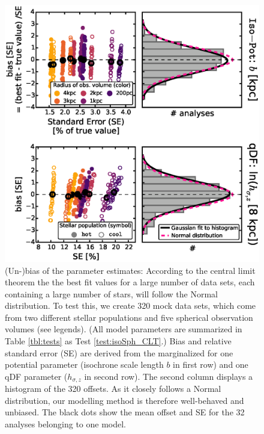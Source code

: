 \begin{figure}[!htbp]
\centering
\includegraphics[width=\columnwidth]{figs/isoSph_CLT_2.eps}
\caption{(Un-)bias of the parameter estimates: According to the central limit theorem the the best fit values for a large number of data sets, each containing a large number of stars, will follow the Normal distribution. To test this, we create 320 mock data sets, which come from two different stellar populations and five spherical observation volumes (see legends). (All model parameters are summarized in Table \ref{tbl:tests} as Test \ref{test:isoSph_CLT}.) Bias and relative standard error (SE) are derived from the marginalized \pdf{} for one potential parameter (isochrone scale length $b$ in first row) and one qDF parameter ($h_{\sigma,z}$ in second row). The second column displays a histogram of the 320 offsets. As it closely follows a Normal distribution, our modelling method is therefore well-behaved and unbiased. The black dots show the mean offset and SE for the 32 analyses belonging to one model. }
\label{fig:isoSph_CLT}
\end{figure}



